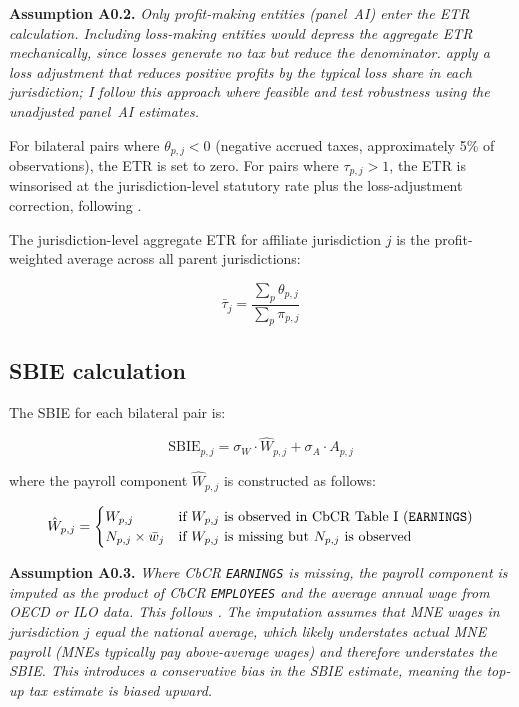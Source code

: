 \documentclass[11pt,a4paper]{article}
\newcommand{\code}[1]{\texttt{#1}}
\newcommand{\assumption}[2]{\noindent\textbf{Assumption #1.} \textit{#2}\medskip}
\begin{document}
\assumption{A0.2}{Only profit-making entities (panel~AI) enter the ETR calculation. Including loss-making entities would depress the aggregate ETR mechanically, since losses generate no tax but reduce the denominator. \citet{hugger2025} apply a loss adjustment that reduces positive profits by the typical loss share in each jurisdiction; I follow this approach where feasible and test robustness using the unadjusted panel~AI estimates.}

For bilateral pairs where $\theta_{p,j} < 0$ (negative accrued taxes, approximately 5\% of observations), the ETR is set to zero. For pairs where $\tau_{p,j} > 1$, the ETR is winsorised at the jurisdiction-level statutory rate plus the loss-adjustment correction, following \citet{hugger2025}.

The jurisdiction-level aggregate ETR for affiliate jurisdiction $j$ is the profit-weighted average across all parent jurisdictions:

\begin{equation}\label{eq:etr_agg}
\bar{\tau}_j = \frac{\sum_p \theta_{p,j}}{\sum_p \pi_{p,j}}
\end{equation}

\subsection{SBIE calculation}\label{sec:sbie}

The SBIE for each bilateral pair is:

\begin{equation}\label{eq:sbie}
\text{SBIE}_{p,j} = \sigma_W \cdot \hat{W}_{p,j} + \sigma_A \cdot A_{p,j}
\end{equation}

where the payroll component $\hat{W}_{p,j}$ is constructed as follows:

\begin{equation}\label{eq:payroll}
\hat{W}_{p,j} = \begin{cases}
W_{p,j} & \text{if } W_{p,j} \text{ is observed in CbCR Table~I (\code{EARNINGS})} \\
N_{p,j} \times \bar{w}_j & \text{if } W_{p,j} \text{ is missing but } N_{p,j} \text{ is observed}
\end{cases}
\end{equation}

\assumption{A0.3}{Where CbCR \code{EARNINGS} is missing, the payroll component is imputed as the product of CbCR \code{EMPLOYEES} and the average annual wage from OECD or ILO data. This follows \citet{barake2022}. The imputation assumes that MNE wages in jurisdiction $j$ equal the national average, which likely understates actual MNE payroll (MNEs typically pay above-average wages) and therefore \emph{understates} the SBIE. This introduces a conservative bias in the SBIE estimate, meaning the top-up tax estimate is biased upward.}
\end{document}
